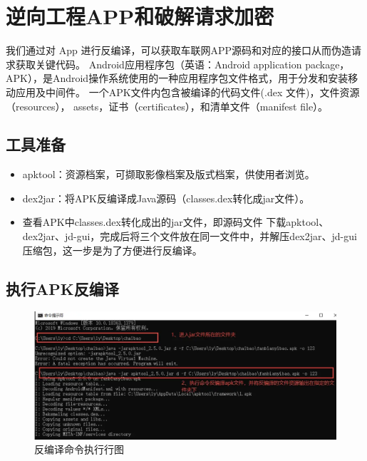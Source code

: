 \section{逆向工程APP和破解请求加密
}
我们通过对 App 进行反编译\cite{yang2015automated}，可以获取车联网APP源码和对应的接口从而伪造请求获取关键代码。
Android应用程序包（英语：Android application package，APK），是Android操作系统使用的一种应用程序包文件格式，用于分发和安装移动应用及中间件。
一个APK文件内包含被编译的代码文件(.dex 文件)，文件资源（resources）， assets，证书（certificates），和清单文件（manifest file）。

\subsection{工具准备}
\begin{itemize}
    \item apktool：资源档案，可撷取影像档案及版式档案，供使用者浏览。        
    \item dex2jar：将APK反编译成Java源码（classes.dex转化成jar文件）。
    \item 查看APK中classes.dex转化成出的jar文件，即源码文件 下载apktool、dex2jar、jd-gui，完成后将三个文件放在同一文件中，并解压dex2jar、jd-gui压缩包，这一步是为了方便进行反编译。
\end{itemize}

\subsection{执行APK反编译}
\begin{figure}
    \centering
    \includegraphics[scale=0.5]{resources/img/i19.png}
    \caption{反编译命令执行行图}
  \end{figure}

